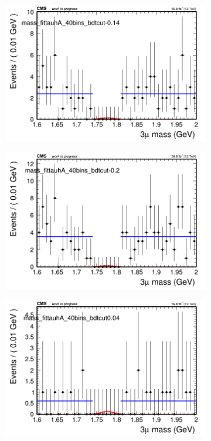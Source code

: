 \begin{figure}[H]
\begin{subfigure}{0.2\textwidth}
        \caption{}
    \end{subfigure}
    \begin{subfigure}{0.2\textwidth}
        \includegraphics[width=\textwidth]{flat_fit/plots/tauhA/massfit_tauhA_40bins_bdtcut-0.14.png}
        \caption{}
    \end{subfigure}
    \begin{subfigure}{0.2\textwidth}
        \includegraphics[width=\textwidth]{flat_fit/plots/tauhA/massfit_tauhA_40bins_bdtcut-0.2.png}
        \caption{}
    \end{subfigure}
    \begin{subfigure}{0.2\textwidth}
        \includegraphics[width=\textwidth]{flat_fit/plots/tauhA/massfit_tauhA_40bins_bdtcut0.04.png}

\end{subfigure}
\end{figure}

